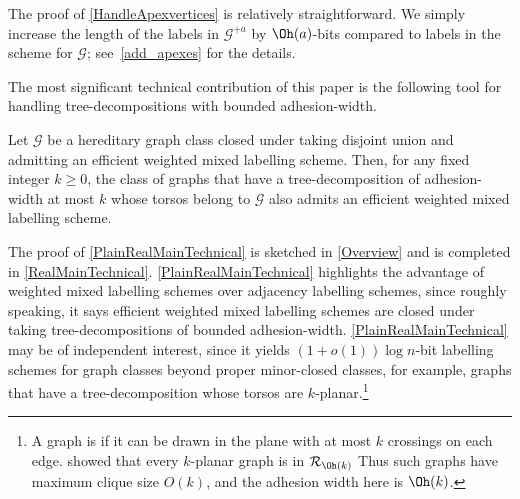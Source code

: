 The proof of \cref{HandleApexvertices}  is relatively straightforward. We simply increase the length of the labels in $\mathcal{G}^{+a}$ by $\Oh(a)$-bits compared to labels in the scheme for $\mathcal{G}$; see~\cref{add_apexes} for the details.


The most significant technical contribution of this paper is the following tool for handling tree-decompositions with bounded adhesion-width.



\begin{thm}\label{PlainRealMainTechnical}
  Let $\mathcal{G}$ be a hereditary graph class closed under taking disjoint union and admitting an efficient weighted mixed labelling scheme. Then, for any fixed integer $k\geq 0$, the class of graphs that have a tree-decomposition of adhesion-width at most $k$ whose torsos belong to $\mathcal{G}$ also admits an efficient weighted mixed labelling scheme.
\end{thm}

The proof of \cref{PlainRealMainTechnical} is sketched in \cref{Overview} and is completed in \cref{RealMainTechnical}. \cref{PlainRealMainTechnical} highlights the advantage of weighted mixed labelling schemes over adjacency labelling schemes, since roughly speaking, it says efficient weighted mixed labelling schemes are closed under taking tree-decompositions of bounded adhesion-width. \cref{PlainRealMainTechnical} may be of independent interest, since it yields $(1+o(1))\log n$-bit labelling schemes for graph classes beyond proper minor-closed classes, for example, graphs that have a tree-decomposition whose torsos are $k$-planar.\footnote{A graph is  if it can be drawn in the plane with at most $k$ crossings on each edge. \citet{dujmovic.morin.ea:graph} showed that every $k$-planar graph is in $\mathcal{R}_{\Oh(k)}$ Thus such graphs have maximum clique size $O(k)$, and the adhesion width here is $\Oh(k)$.}

